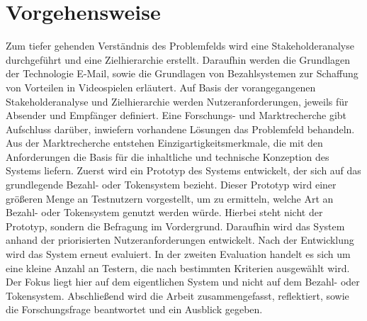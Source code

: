 
\section{Vorgehensweise}
\label{Vorgehensweise}

Zum tiefer gehenden Verständnis des Problemfelds wird eine Stakeholderanalyse durchgeführt und eine Zielhierarchie erstellt. Daraufhin werden die Grundlagen der Technologie E-Mail, sowie die Grundlagen von Bezahlsystemen zur Schaffung von Vorteilen in Videospielen erläutert. Auf Basis der vorangegangenen Stakeholderanalyse und Zielhierarchie werden Nutzeranforderungen, jeweils für Absender und Empfänger definiert. Eine Forschungs- und Marktrecherche gibt Aufschluss darüber, inwiefern vorhandene Lösungen das Problemfeld behandeln. Aus der Marktrecherche entstehen Einzigartigkeitsmerkmale, die mit den Anforderungen die Basis für die inhaltliche und technische Konzeption des Systems liefern. Zuerst wird ein Prototyp des Systems entwickelt, der sich auf das grundlegende Bezahl- oder Tokensystem bezieht. Dieser Prototyp wird einer größeren Menge an Testnutzern vorgestellt, um zu ermitteln, welche Art an Bezahl- oder Tokensystem genutzt werden würde. Hierbei steht nicht der Prototyp, sondern die Befragung im Vordergrund. Daraufhin wird das System anhand der priorisierten Nutzeranforderungen entwickelt. Nach der Entwicklung wird das System erneut evaluiert. In der zweiten Evaluation handelt es sich um eine kleine Anzahl an Testern, die nach bestimmten Kriterien ausgewählt wird. Der Fokus liegt hier auf dem eigentlichen System und nicht auf dem Bezahl- oder Tokensystem. Abschließend wird die Arbeit zusammengefasst, reflektiert, sowie die Forschungsfrage beantwortet und ein Ausblick gegeben.



